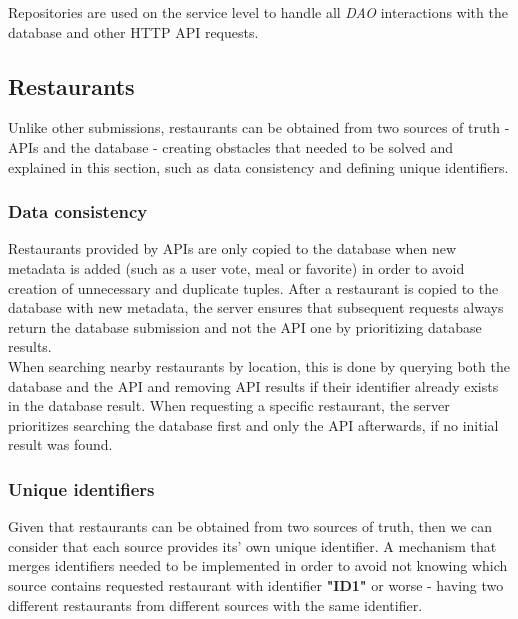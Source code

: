 Repositories are used on the service level to handle all \textit{DAO} interactions with
the database and other HTTP API requests.\\

\subsection{Restaurants}

Unlike other submissions, restaurants can be obtained from two sources of truth - APIs and the database -
creating obstacles that needed to be solved and explained in this section, such as data consistency and defining unique identifiers.\\

\subsubsection{Data consistency}

Restaurants provided by APIs are only copied to the database when new metadata is added (such as a user vote, meal or favorite) in order
to avoid creation of unnecessary and duplicate tuples. After a restaurant is copied to the database with new metadata, the server ensures
that subsequent requests always return the database submission and not the API one by prioritizing database results.\\

When searching nearby restaurants by location, this is done by querying both the database and the API and removing API results if their
identifier already exists in the database result. When requesting a specific restaurant, the server prioritizes searching the database
first and only the API afterwards, if no initial result was found.\\

\subsubsection{Unique identifiers}

Given that restaurants can be obtained from two sources of truth, then we can consider that each source provides its' own unique identifier.
A mechanism that merges identifiers needed to be implemented in order to avoid not knowing which source contains requested restaurant with
identifier \textbf{"ID1"} or worse - having two different restaurants from different sources with the same identifier.\\

